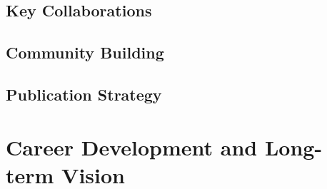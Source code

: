 \documentclass[11pt,a4paper]{article}
\begin{document}
    \subsection{Key Collaborations}
    
    
    
    
    \subsection{Community Building}
    
    
    
    \subsection{Publication Strategy}
    
\section{Career Development and Long-term Vision}
\label{sec:career}

\end{document}
